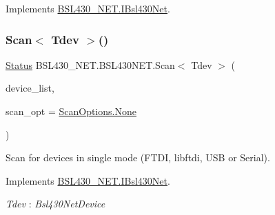 Implements \mbox{\hyperlink{interface_b_s_l430___n_e_t_1_1_i_bsl430_net_abde671fd1ec4d013dd7fe5902f04ee97}{B\+S\+L430\+\_\+\+N\+E\+T.\+I\+Bsl430\+Net}}.

\mbox{\label{class_b_s_l430___n_e_t_1_1_b_s_l430_n_e_t_a0299d3468b1a5c2f4facf0bacfaa6bb0}} 
\subsubsection{\texorpdfstring{Scan$<$ Tdev $>$()}{Scan< Tdev >()}}
{\footnotesize\ttfamily \mbox{\hyperlink{class_b_s_l430___n_e_t_1_1_status}{Status}} B\+S\+L430\+\_\+\+N\+E\+T.\+B\+S\+L430\+N\+E\+T.\+Scan$<$ Tdev $>$ (\begin{DoxyParamCaption}\item[{out List$<$ Tdev $>$}]{device\+\_\+list,  }\item[{\mbox{\hyperlink{namespace_b_s_l430___n_e_t_a4cd6f8166a2a97ccb3405df2287d4ba8}{Scan\+Options}}}]{scan\+\_\+opt = {\ttfamily \mbox{\hyperlink{namespace_b_s_l430___n_e_t_a4cd6f8166a2a97ccb3405df2287d4ba8a6adf97f83acf6453d4a6a4b1070f3754}{Scan\+Options.\+None}}} }\end{DoxyParamCaption})}



Scan for devices in single mode (F\+T\+DI, libftdi, U\+SB or Serial). 



Implements \mbox{\hyperlink{interface_b_s_l430___n_e_t_1_1_i_bsl430_net_ab6f53bec39332434e99912ce3413dbcd}{B\+S\+L430\+\_\+\+N\+E\+T.\+I\+Bsl430\+Net}}.

\begin{Desc}
\item[Type Constraints]\begin{description}
\item[{\em Tdev} : {\em Bsl430\+Net\+Device}]\end{description}
\end{Desc}
\mbox{\label{class_b_s_l430___n_e_t_1_1_b_s_l430_n_e_t_a6d01c3021cc44318ab8ee695a910ecfd}} 
